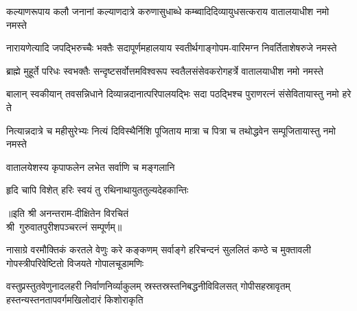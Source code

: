 
\twolineshloka
{कल्याणरूपाय कलौ जनानां कल्याणदात्रे करुणासुधाब्धे}
{कम्ब्वादिदिव्यायुधसत्कराय वातालयाधीश नमो नमस्ते}

\twolineshloka
{नारायणेत्यादि जपद्भिरुच्चैः भक्तैः सदापूर्णमहालयाय}
{स्वतीर्थगाङ्गोपम-वारिमग्न निवर्तिताशेषरुजे नमस्ते}

\twolineshloka
{ब्राह्मे मुहूर्ते परिधः स्वभक्तैः सन्दृष्टसर्वोत्तमविश्वरूप}
{स्वतैलसंसेवकरोगहर्त्रे वातालयाधीश नमो नमस्ते}

\twolineshloka
{बालान् स्वकीयान् तवसन्निधाने दिव्यान्नदानात्परिपालयद्भिः}
{सदा पठद्भिश्च पुराणरत्नं संसेवितायास्तु नमो हरे ते}

\twolineshloka
{नित्यान्नदात्रे च महीसुरेभ्यः नित्यं दिविस्थैर्निशि पूजिताय}
{मात्रा च पित्रा च तथोद्धवेन सम्पूजितायास्तु नमो नमस्ते}

{वातालयेशस्य कृपाफलेन लभेत सर्वाणि च मङ्गलानि}

{हृदि चापि विशेत् हरिः स्वयं तु रथिनाथायुततुल्यदेहकान्तिः}

॥इति श्री अनन्तराम-दीक्षितेन विरचितं\\ श्री~गुरुवातपुरीशपञ्चरत्नं सम्पूर्णम्‌॥

\closesection
\setlength{\shlokaspaceskip}{6pt}
{नासाग्रे वरमौक्तिकं करतले वेणुः करे कङ्कणम्}
{सर्वाङ्गे हरिचन्दनं सुललितं कण्ठे च मुक्तावली}
{गोपस्त्रीपरिवेष्टितो विजयते गोपालचूडामणिः}

{वस्तुप्रस्तुतवेणुनादलहरी निर्वाणनिर्व्याकुलम्}
{स्रस्तस्रस्तनिबद्धनीविविलसत् गोपीसहस्रावृतम्}
{हस्तन्यस्तनतापवर्गमखिलोदारं किशोराकृति}


\setlength{\shlokaspaceskip}{24pt}